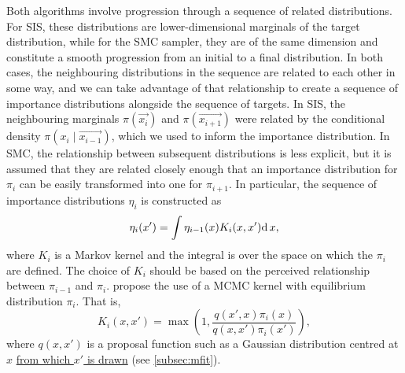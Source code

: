 Both algorithms involve progression through a sequence of related
distributions. For \gls{SIS}, these distributions are lower-dimensional
marginals of the target distribution, while for the \gls{SMC} sampler, they are
of the same dimension and constitute a smooth progression from an initial to a
final distribution. In both cases, the neighbouring distributions in the
sequence are related to each other in some way, and we can take advantage of
that relationship to create a sequence of importance distributions alongside
the sequence of targets. In \gls{SIS}, the neighbouring marginals
$\pi(\vec{x_i})$ and $\pi(\vec{x_{i+1}})$ were related by the conditional
density $\pi(x_i \mid \vec{x_{i-1}})$, which we used to inform the importance
distribution. In \gls{SMC}, the relationship between subsequent distributions
is less explicit, but it is assumed that they are related closely enough that
an importance distribution for $\pi_i$ can be easily transformed into one for
$\pi_{i+1}$. In particular, the sequence of importance distributions $\eta_i$
is constructed as
\begin{align}
  \label{eq:impint}
  \eta_i(x') = \int \eta_{i-1}(x) K_i(x, x') \mathrm{d}\, x,
\end{align}
where $K_i$ is a Markov kernel and the integral is over the space on which the
$\pi_i$ are defined. The choice of $K_i$ should be based on the perceived
relationship between $\pi_{i-1}$ and $\pi_i$. \textcite{del2006sequential}
propose the use of a \gls{MCMC} kernel with equilibrium distribution $\pi_i$.
That is,
\[
  K_i(x, x') = \max\left(1, \frac{q(x', x)\pi_i(x)}{q(x, x')\pi_i(x')}\right),
\]
where $q(x, x')$ is a proposal function such as a Gaussian distribution
centred at $x$ {\color{blue}\uline{from which $x'$ is drawn}} (see
\cref{subsec:mfit}). 

